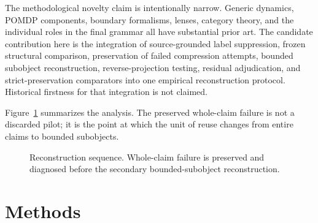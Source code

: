 \documentclass[11pt]{article}
\begin{document}
The methodological novelty claim is intentionally narrow. Generic dynamics, POMDP components, boundary formalisms, lenses, category theory, and the individual roles in the final grammar all have substantial prior art. The candidate contribution here is the integration of source-grounded label suppression, frozen structural comparison, preservation of failed compression attempts, bounded subobject reconstruction, reverse-projection testing, residual adjudication, and strict-preservation comparators into one empirical reconstruction protocol. Historical firstness for that integration is not claimed.

Figure~\ref{fig:pipeline} summarizes the analysis. The preserved whole-claim failure is not a discarded pilot; it is the point at which the unit of reuse changes from entire claims to bounded subobjects.

\begin{figure}[htbp]
\centering
{}
\caption{Reconstruction sequence. Whole-claim failure is preserved and diagnosed before the secondary bounded-subobject reconstruction.}
\label{fig:pipeline}
\end{figure}

\section{Methods}
\end{document}
